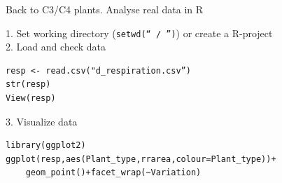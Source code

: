 \documentclass{beamer}
\makeatletter
\newenvironment{kframe}{%
 \def\at@end@of@kframe{}%
 \ifinner\ifhmode%
  \def\at@end@of@kframe{\end{minipage}}%
  \begin{minipage}{\columnwidth}%
 \fi\fi%
 \def\FrameCommand##1{\hskip\@totalleftmargin \hskip-\fboxsep
 \colorbox{shadecolor}{##1}\hskip-\fboxsep
     \hskip-\linewidth \hskip-\@totalleftmargin \hskip\columnwidth}%
 \MakeFramed {\advance\hsize-\width
   \@totalleftmargin\z@ \linewidth\hsize
   \@setminipage}}%
 {\par\unskip\endMakeFramed%
 \at@end@of@kframe}
\newenvironment{knitrout}{}{} %
\makeatother
\begin{document}
\begin{frame}[fragile]{Back to C3/C4 plants. Analyse real data in R}

1. Set working directory (\texttt{setwd(`` / '')}) or create a R-project\\

2. Load and check data
\begin{knitrout}
\color{fgcolor}\begin{kframe}
\begin{verbatim}
resp <- read.csv("d_respiration.csv”)
str(resp)
View(resp)
\end{verbatim}
\end{kframe}
\end{knitrout}

3. Visualize data
\begin{knitrout}
\color{fgcolor}\begin{kframe}
\begin{verbatim}
library(ggplot2)
ggplot(resp,aes(Plant_type,rrarea,colour=Plant_type))+
    geom_point()+facet_wrap(~Variation)
\end{verbatim}
\end{kframe}
\end{knitrout}

\end{frame}
\end{document}
